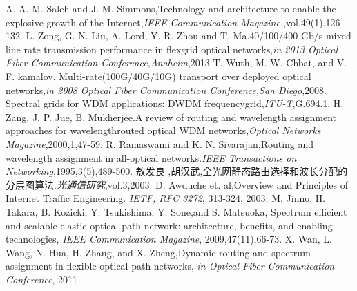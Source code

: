 \documentclass[master]{thesis-uestc}
\begin{document}
\begin{thebibliography}{1}
A. A. M. Saleh and J. M. Simmons,Technology and architecture to enable the explosive growth of the Internet,\emph{IEEE Communication Magazine.},vol,49(1),126-132.
L. Zong, G. N. Liu, A. Lord, Y. R. Zhou and T. Ma.40/100/400 Gb/s mixed line rate transmission performance in flexgrid optical networks,\emph{in 2013 Optical Fiber Communication Conference,Anaheim},2013
T. Wuth, M. W. Chbat, and V. F. kamalov, Multi-rate(100G/40G/10G) transport over deployed optical networks,\emph{in 2008 Optical Fiber Communication Conference,San Diego},2008.
Spectral grids for WDM applications: DWDM frequencygrid,\emph{ITU-T},G.694.1.
H. Zang, J. P. Jue, B. Mukherjee.A review of routing and wavelength assignment approaches for wavelengthrouted optical WDM networks,\emph{Optical Networks Magazine},2000,1,47-59.
R. Ramaswami and K. N. Sivarajan,Routing and wavelength assignment in all-optical networks.\emph{IEEE Transactions on Networking},1995,3(5),489-500.
敖发良 ,胡汉武,全光网静态路由选择和波长分配的分层图算法.\emph{光通信研究},vol.3,2003.
D. Awduche et. al,Overview and Principles of Internet Traffic Engineering. \emph{IETF, RFC 3272}, 313-324, 2003.
M. Jinno, H. Takara, B. Kozicki, Y. Tsukishima, Y. Sone,and S. Matsuoka, Spectrum efficient and scalable elastic optical path network: architecture, benefits, and enabling technologies, \emph{IEEE Communication Magazine}, 2009,47(11),66-73.
X. Wan, L. Wang, N. Hua, H. Zhang, and X. Zheng,Dynamic routing and spectrum assignment in flexible optical path networks, \emph{in Optical Fiber Communication Conference}, 2011
\end{thebibliography}
\end{document}
